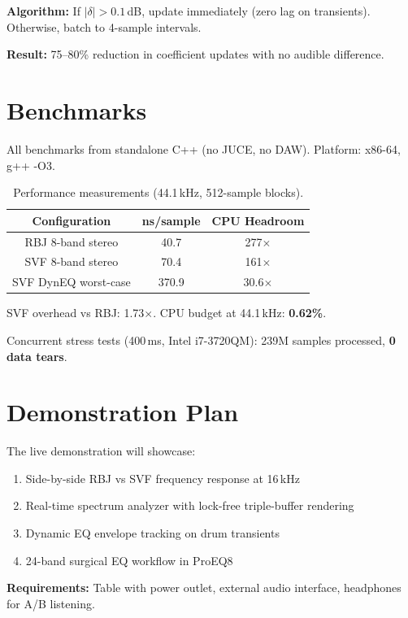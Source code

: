 \documentclass[twoside,a4paper]{article}
\begin{document}
\textbf{Algorithm:} If $|\delta| > 0.1$\,dB, update immediately (zero lag on transients). Otherwise, batch to 4-sample intervals.

\textbf{Result:} 75--80\% reduction in coefficient updates with no audible difference.

\section{Benchmarks}
\label{sec:benchmarks}

All benchmarks from standalone C++ (no JUCE, no DAW). Platform: x86-64, g++ -O3.

\begin{table}[ht]
  \caption{Performance measurements (44.1\,kHz, 512-sample blocks).}
  \centering
  \begin{tabular}{ccc}
    \toprule
    Configuration & ns/sample & CPU Headroom \\
    \midrule
    RBJ 8-band stereo & 40.7 & 277$\times$ \\
    SVF 8-band stereo & 70.4 & 161$\times$ \\
    SVF DynEQ worst-case & 370.9 & 30.6$\times$ \\
    \bottomrule
  \end{tabular}
  \label{tab:benchmarks}
\end{table}

SVF overhead vs RBJ: 1.73$\times$. CPU budget at 44.1\,kHz: \textbf{0.62\%}.

Concurrent stress tests (400\,ms, Intel i7-3720QM): 239M samples processed, \textbf{0 data tears}.

\section{Demonstration Plan}
\label{sec:demo}

The live demonstration will showcase:
\begin{enumerate}
\item Side-by-side RBJ vs SVF frequency response at 16\,kHz
\item Real-time spectrum analyzer with lock-free triple-buffer rendering
\item Dynamic EQ envelope tracking on drum transients
\item 24-band surgical EQ workflow in ProEQ8
\end{enumerate}

\textbf{Requirements:} Table with power outlet, external audio interface, headphones for A/B listening.
\end{document}
